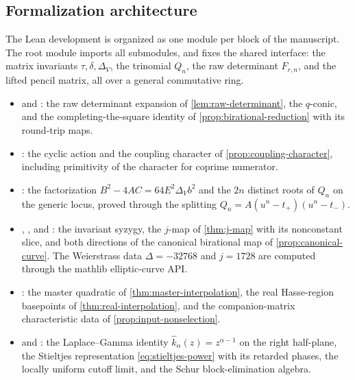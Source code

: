 \documentclass[11pt,reqno]{amsart}
\theoremstyle{remark}
\begin{document}
\subsection{Formalization architecture}

The Lean development is organized as one module per block of the
manuscript.  The root module  imports all submodules, and
 fixes the shared interface: the matrix invariants
$\tau,\delta,\Delta_V$, the trinomial $Q_n$, the raw determinant
$F_{r,n}$, and the lifted pencil matrix, all over a general commutative
ring.

\begin{itemize}
\item {} and : the
raw determinant expansion of \cref{lem:raw-determinant}, the $q$-conic, and
the completing-the-square identity of \cref{prop:birational-reduction}
with its round-trip maps.

\item {}: the cyclic action and the coupling
character of \cref{prop:coupling-character}, including primitivity of the
character for coprime numerator.

\item {}: the factorization
$B^2-4AC=64E^2\Delta_Vb^2$ and the $2n$ distinct roots of $Q_n$ on the
generic locus, proved through the splitting
$Q_n=A(u^n-t_+)(u^n-t_-)$.

\item {}, , and
: the invariant syzygy, the $j$-map of
\cref{thm:j-map} with its nonconstant slice, and both directions of the
canonical birational map of \cref{prop:canonical-curve}.  The Weierstrass
data $\Delta=-32768$ and $j=1728$ are computed through the mathlib
elliptic-curve API.

\item {}: the master quadratic of
\cref{thm:master-interpolation}, the real Hasse-region basepoints of
\cref{thm:real-interpolation}, and the companion-matrix characteristic
data of \cref{prop:input-nonselection}.

\item {} and : the
Laplace--Gamma identity $\widehat k_\alpha(z)=z^{\alpha-1}$ on the right
half-plane, the Stieltjes representation \eqref{eq:stieltjes-power} with
its retarded phases, the locally uniform cutoff limit, and the Schur
block-elimination algebra.


\end{itemize}
\end{document}
